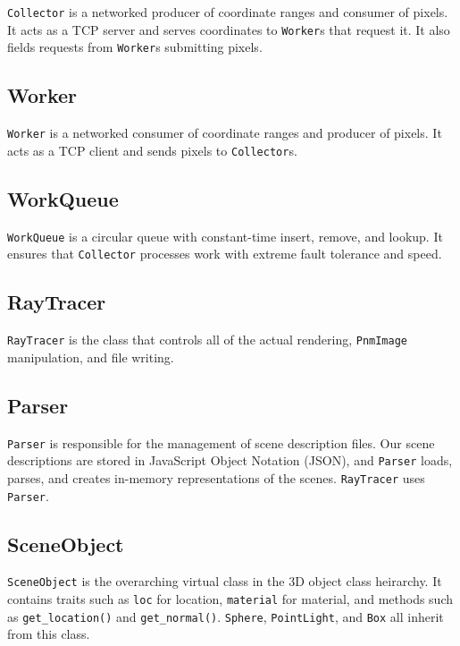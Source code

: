 \documentclass[letterpaper,twocolumn,10pt]{article}
\begin{document}
\verb|Collector| is a networked producer of coordinate ranges and consumer of
pixels. It acts as a TCP server and serves coordinates to \verb|Worker|s that
request it. It also fields requests from \verb|Worker|s submitting pixels.

\subsection{Worker}

\verb|Worker| is a networked consumer of coordinate ranges and producer of
pixels. It acts as a TCP client and sends pixels to \verb|Collector|s.

\subsection{WorkQueue}

\verb|WorkQueue| is a circular queue with constant-time insert, remove, and
lookup. It ensures that \verb|Collector| processes work with extreme fault
tolerance and speed.

\subsection{RayTracer}

\verb|RayTracer| is the class that controls all of the actual rendering,
\verb|PnmImage| manipulation, and file writing.

\subsection{Parser}

\verb|Parser| is responsible for the management of scene description files. Our
scene descriptions are stored in JavaScript Object Notation (JSON), and
\verb|Parser| loads, parses, and creates in-memory representations of the
scenes. \verb|RayTracer| uses \verb|Parser|.

\subsection{SceneObject}

\verb|SceneObject| is the overarching virtual class in the 3D object class
heirarchy. It contains traits such as \verb|loc| for location, \verb|material|
for material, and methods such as \verb|get_location()| and \verb|get_normal()|.
\verb|Sphere|, \verb|PointLight|, and \verb|Box| all inherit from this class.
\end{document}
